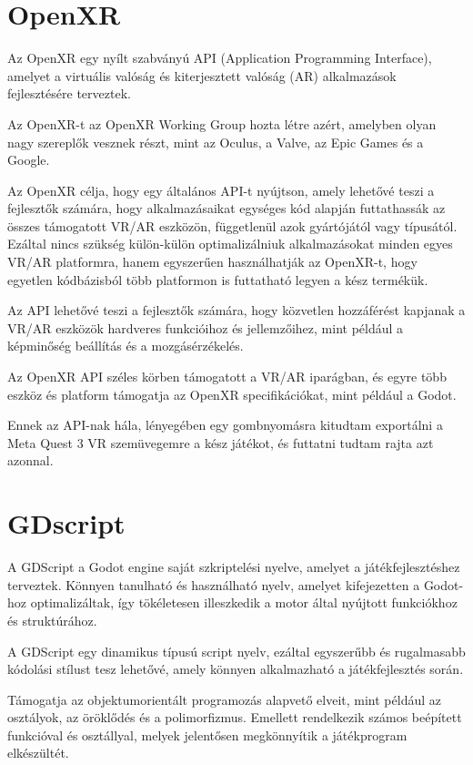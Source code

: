 \section{OpenXR}
Az OpenXR \cite{khronosOpenXRHighperformance} egy nyílt szabványú API (Application Programming Interface), amelyet a virtuális valóság és kiterjesztett valóság (AR) alkalmazások fejlesztésére terveztek. 

Az OpenXR-t az OpenXR Working Group  hozta létre azért, amelyben olyan nagy szereplők vesznek részt, mint az Oculus, a Valve, az Epic Games és a Google.

Az OpenXR célja, hogy egy általános API-t nyújtson, amely lehetővé teszi a fejlesztők számára, hogy alkalmazásaikat egységes kód alapján futtathassák az összes támogatott VR/AR eszközön, függetlenül azok gyártójától vagy típusától. 
Ezáltal nincs szükség külön-külön optimalizálniuk alkalmazásokat minden egyes VR/AR platformra, hanem egyszerűen használhatják az OpenXR-t, hogy egyetlen kódbázisból több platformon is futtatható legyen a kész termékük.

Az API lehetővé teszi a fejlesztők számára, hogy közvetlen hozzáférést kapjanak a VR/AR eszközök hardveres funkcióihoz és jellemzőihez, mint például a képminőség beállítás és a mozgásérzékelés.

Az OpenXR API széles körben támogatott a VR/AR iparágban, és egyre több eszköz és platform támogatja az OpenXR specifikációkat, mint például a Godot.

Ennek az API-nak hála, lényegében egy gombnyomásra kitudtam exportálni a Meta Quest 3 VR szemüvegemre a kész játékot, és futtatni tudtam rajta azt azonnal.

\section{GDscript}
A GDScript \cite{godotengineGDScriptReference} a Godot engine \cite{godotengineGodotEngine} saját szkriptelési nyelve, amelyet a játékfejlesztéshez terveztek. 
Könnyen tanulható és használható nyelv, amelyet kifejezetten a Godot-hoz optimalizáltak, így tökéletesen illeszkedik a motor által nyújtott funkciókhoz és struktúrához.

A GDScript egy dinamikus típusú script nyelv, ezáltal egyszerűbb és rugalmasabb kódolási stílust tesz lehetővé, amely könnyen alkalmazható a játékfejlesztés során.

Támogatja az objektumorientált programozás alapvető elveit, mint például az osztályok, az öröklődés és a polimorfizmus. Emellett rendelkezik számos beépített funkcióval és osztállyal, melyek jelentősen megkönnyítik a játékprogram elkészültét.
